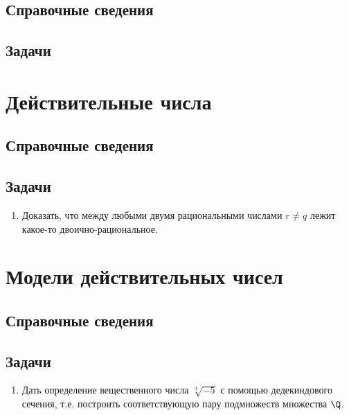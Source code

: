 \subsection*{Справочные сведения}

\subsection*{Задачи}


\section{Действительные числа}

\subsection*{Справочные сведения}

\subsection*{Задачи}

\begin{enumerate}
\item Доказать, что между любыми двумя рациональными числами $r\ne q$ лежит какое-то двоично-рациональное.
\end{enumerate}


\section{Модели действительных чисел}

\subsection*{Справочные сведения}

\subsection*{Задачи}

\begin{enumerate}
\item Дать определение вещественного числа $\sqrt[3]{-5}$ с помощью дедекиндового сечения, т.е. построить соответствующую пару подмножеств множества $\Q$.
\end{enumerate}




\begin{comment}
\chapter{16. Элементы математического анализа}
\end{comment}

